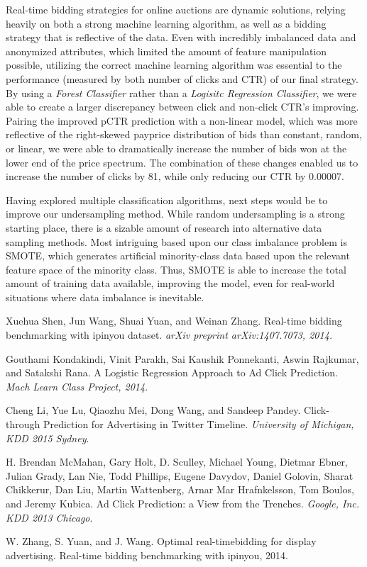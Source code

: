 \documentclass{sig-alternate-05-2015}
\begin{document}
Real-time bidding strategies for online auctions are dynamic solutions, relying heavily on both a strong machine learning algorithm, as well as a bidding strategy that is reflective of the data. Even with incredibly imbalanced data and anonymized attributes, which limited the amount of feature manipulation possible, utilizing the correct machine learning algorithm was essential to the performance (measured by both number of clicks and CTR) of our final strategy. By using a \textit{Forest Classifier} rather than a \textit{Logisitc Regression Classifier}, we were able to create a larger discrepancy between click and non-click CTR's improving. Pairing the improved pCTR prediction with a non-linear model, which was more reflective of the right-skewed payprice distribution of bids than constant, random, or linear, we were able to dramatically increase the number of bids won at the lower end of the price spectrum.  The combination of these changes enabled us to increase the number of clicks by 81, while only reducing our CTR by 0.00007.

Having explored multiple classification algorithms, next steps would be to improve our undersampling method.  While random undersampling is a strong starting place, there is a sizable amount of research into alternative data sampling methods. Most intriguing based upon our class imbalance problem is SMOTE, which generates artificial minority-class data based upon the relevant feature space of the minority class. Thus, SMOTE is able to increase the total amount of training data available, improving the model, even for real-world situations where data imbalance is inevitable.

\begin{thebibliography}{4}
Xuehua Shen, Jun Wang, Shuai Yuan, and Weinan Zhang.
Real-time bidding benchmarking with ipinyou
dataset.
\textit{arXiv preprint arXiv:1407.7073, 2014.}

Gouthami Kondakindi, Vinit Parakh, Sai Kaushik Ponnekanti, Aswin Rajkumar, and Satakshi Rana.
A Logistic Regression Approach to Ad Click
Prediction.
\textit{Mach Learn Class Project, 2014}.

Cheng Li, Yue Lu, Qiaozhu Mei, Dong Wang, and Sandeep Pandey.
Click-through Prediction for Advertising in Twitter Timeline.
\textit{University of Michigan, KDD 2015 Sydney}.

H. Brendan McMahan, Gary Holt, D. Sculley, Michael Young, Dietmar Ebner, Julian Grady, Lan Nie, Todd Phillips, Eugene Davydov, Daniel Golovin, Sharat Chikkerur, Dan Liu, Martin Wattenberg, Arnar Mar Hrafnkelsson, Tom Boulos, and Jeremy Kubica.
Ad Click Prediction: a View from the Trenches.
\textit{Google, Inc. KDD 2013 Chicago}.

W. Zhang, S. Yuan, and J. Wang.
Optimal real-timebidding for display advertising.
Real-time bidding benchmarking with ipinyou, 2014.

\end{thebibliography}
\end{document}
